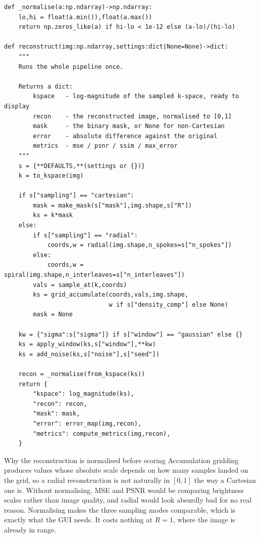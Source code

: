 \documentclass[11pt,a4paper]{article}
\begin{document}
\begin{lstlisting}
def _normalise(a:np.ndarray)->np.ndarray:
    lo,hi = float(a.min()),float(a.max())
    return np.zeros_like(a) if hi-lo < 1e-12 else (a-lo)/(hi-lo)

def reconstruct(img:np.ndarray,settings:dict|None=None)->dict:
    """
    Runs the whole pipeline once.

    Returns a dict:
        kspace   - log-magnitude of the sampled k-space, ready to display
        recon    - the reconstructed image, normalised to [0,1]
        mask     - the binary mask, or None for non-Cartesian
        error    - absolute difference against the original
        metrics  - mse / psnr / ssim / max_error
    """
    s = {**DEFAULTS,**(settings or {})}
    k = to_kspace(img)

    if s["sampling"] == "cartesian":
        mask = make_mask(s["mask"],img.shape,s["R"])
        ks = k*mask
    else:
        if s["sampling"] == "radial":
            coords,w = radial(img.shape,n_spokes=s["n_spokes"])
        else:
            coords,w = spiral(img.shape,n_interleaves=s["n_interleaves"])
        vals = sample_at(k,coords)
        ks = grid_accumulate(coords,vals,img.shape,
                             w if s["density_comp"] else None)
        mask = None

    kw = {"sigma":s["sigma"]} if s["window"] == "gaussian" else {}
    ks = apply_window(ks,s["window"],**kw)
    ks = add_noise(ks,s["noise"],s["seed"])

    recon = _normalise(from_kspace(ks))
    return {
        "kspace": log_magnitude(ks),
        "recon": recon,
        "mask": mask,
        "error": error_map(img,recon),
        "metrics": compute_metrics(img,recon),
    }
\end{lstlisting}

\begin{notebox}{Why the reconstruction is normalised before scoring}
Accumulation gridding produces values whose absolute scale depends on how many
samples landed on the grid, so a radial reconstruction is not naturally in
$[0,1]$ the way a Cartesian one is. Without normalising, MSE and PSNR would be
comparing brightness scales rather than image quality, and radial would look
absurdly bad for no real reason. Normalising makes the three sampling modes
comparable, which is exactly what the GUI needs. It costs nothing at $R=1$, where
the image is already in range.
\end{notebox}
\end{document}
